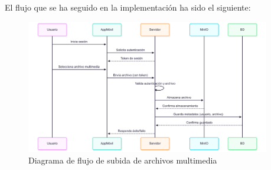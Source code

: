 El flujo que se ha seguido en la implementación ha sido el siguiente:
\begin{figure}[H]
    \begin{center}
        \includegraphics[width=0.95\textwidth]{assets/sprint3/diagrama-subida-archivos.png}
    \end{center}
    \caption{Diagrama de flujo de subida de archivos multimedia}\label{fig:diagrama-flujo-subida-archivos}
\end{figure}

